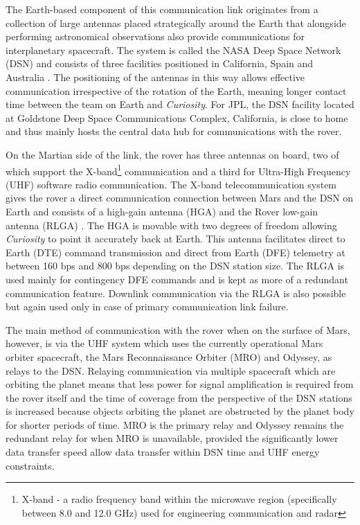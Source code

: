         
        The Earth-based component of this communication link originates from a collection of large antennas placed strategically around the Earth that alongside performing astronomical observations also provide communications for interplanetary spacecraft. The system is called the NASA Deep Space Network (DSN) and consists of three facilities positioned in California, Spain and Australia \cite{jpldsnabout}. The positioning of the antennas in this way allows effective communication irrespective of the rotation of the Earth, meaning longer contact time between the team on Earth and \textit{Curiosity}. For JPL, the DSN facility located at Goldstone Deep Space Communications Complex, California, is close to home and thus mainly hosts the central data hub for communications with the rover.
        
        On the Martian side of the link, the rover has three antennas on board, two of which support the X-band\footnote{X-band - a radio frequency band within the microwave region (specifically between 8.0 and 12.0 GHz) used for engineering communication and radar} communication and a third for Ultra-High Frequency (UHF) software radio communication. The X-band telecommunication system gives the rover a direct communication connection between Mars and the DSN on Earth and consists of a high-gain antenna (HGA) and the Rover low-gain antenna (RLGA) \cite{jpltelecom}. The HGA is movable with two degrees of freedom allowing \textit{Curiosity} to point it accurately back at Earth. This antenna facilitates direct to Earth (DTE) command transmission and direct from Earth (DFE) telemetry at between 160 bps and 800 bps depending on the DSN station size. The RLGA is used mainly for contingency DFE commands and is kept as more of a redundant communication feature. Downlink communication via the RLGA is also possible but again used only in case of primary communication link failure.
        
        The main method of communication with the rover when on the surface of Mars, however, is via the UHF system which uses the currently operational Mars orbiter spacecraft, the Mars Reconnaissance Orbiter (MRO) and Odyssey, as relays to the DSN. Relaying communication via multiple spacecraft which are orbiting the planet means that less power for signal amplification is required from the rover itself and the time of coverage from the perspective of the DSN stations is increased because objects orbiting the planet are obstructed by the planet body for shorter periods of time. MRO is the primary relay and Odyssey remains the redundant relay for when MRO is unavailable, provided the significantly lower data transfer speed allow data transfer within DSN time and UHF energy constraints.
        
